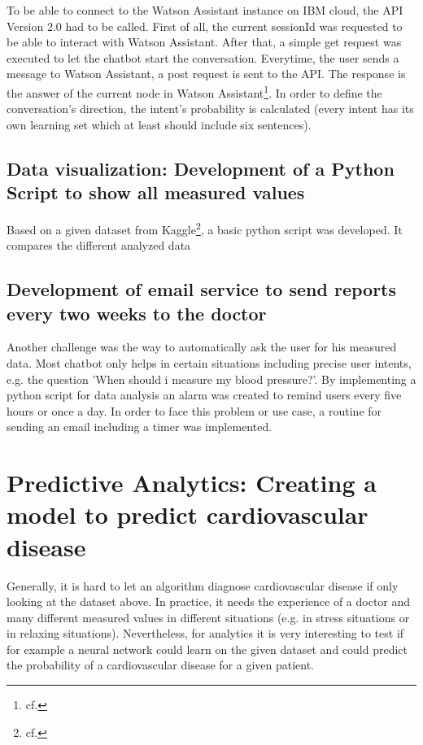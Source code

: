 To be able to connect to the Watson Assistant instance on IBM cloud, the \ac{API} Version 2.0 had to be called. First of all, the current sessionId was requested to be able to interact with Watson Assistant. After that, a simple get request was executed to let the chatbot start the conversation. Everytime, the user sends a message to Watson Assistant, a post request is sent to the \ac{API}. The response is the answer of the current node in Watson Assistant\footnote{cf.\autocite{wa_api_v2}}. In order to define the conversation's direction, the intent's probability is calculated (every intent has its own learning set which at least should include six sentences).

\subsection{Data visualization: Development of a Python Script to show all measured values} 

Based on a given dataset from Kaggle\footnote{cf.\autocite{kaggle}}, a basic python script was developed. It compares the different analyzed data


\subsection{Development of email service to send reports every two weeks to the doctor}

Another challenge was the way to automatically ask the user for his measured data. Most chatbot only helps in certain situations including precise user intents, e.g. the question 'When should i measure my blood pressure?'. By implementing a python script for data analysis an alarm was created to remind users every five hours or once a day.
In order to face this problem or use case, a routine for sending an email including a timer was implemented.

\section{Predictive Analytics: Creating a model to predict cardiovascular disease} \label{predict}
Generally, it is hard to let an algorithm diagnose cardiovascular disease if only looking at the dataset above. In practice, it needs the experience of a doctor and many different measured values in different situations (e.g. in stress situations or in relaxing situations). Nevertheless, for analytics it is very interesting to test if for example a neural network could learn on the given dataset and could predict the probability of a cardiovascular disease for a given patient. 

